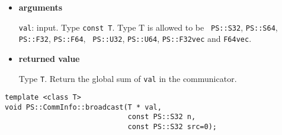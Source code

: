 \begin{itemize}

\item{\bf arguments}

{\tt val}: input. Type {\tt const T}. Type T is allowed to be {\tt
     PS::S32}, {\tt PS::S64}, {\tt PS::F32}, {\tt PS::F64}, {\tt
     PS::U32}, {\tt PS::U64}, {\tt PS::F32vec} and {\tt F64vec}.
     

\item{\bf returned value}

Type {\tt T}. Return the global sum of {\tt val} in the communicator.





\end{itemize}


\begin{screen}
\begin{verbatim}
template <class T>
void PS::CommInfo::broadcast(T * val,
                             const PS::S32 n,
                             const PS::S32 src=0);
\end{verbatim}
\end{screen}

